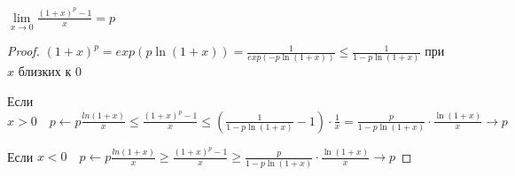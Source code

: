 \begin{theorem-non}
    $\lim\limits_{x \rightarrow 0}{\frac{(1+x)^p - 1}{x}} = p$
    \begin{proof}
        $(1+x)^p = exp(p \ln{(1 + x)}) = \frac{1}{exp(-p \ln{(1+x)})} \leqslant \frac{1}{1 - p \ln{(1+x)}}$ при $x$ близких к 0

        Если $x > 0 \quad p \longleftarrow p\frac{ln(1+x)}{x} \leqslant \frac{(1+x)^p - 1}{x} \leqslant \left(\frac{1}{1 - p\ln{(1+x)}} - 1\right)\cdot \frac{1}{x} =
        \frac{p}{1 - p\ln{(1+x)}} \cdot \frac{\ln{(1+x)}}{x} \longrightarrow p$ 

        Если $x < 0 \quad p \longleftarrow p\frac{ln(1+x)}{x} \geqslant \frac{(1+x)^p - 1}{x} \geqslant
        \frac{p}{1 - p\ln{(1+x)}} \cdot \frac{\ln{(1+x)}}{x} \longrightarrow p$ 
    \end{proof}
\end{theorem-non}
